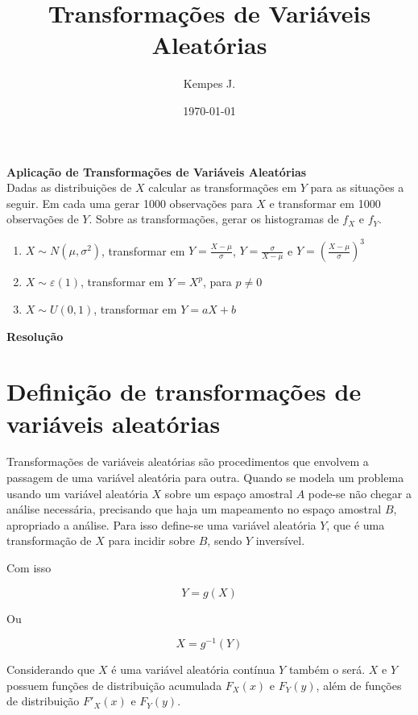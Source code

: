 \documentclass{article}
\title{Transformações de Variáveis Aleatórias}
\author{Kempes J.}
\date{\today}
\begin{document}


\maketitle
  
\LARGE{\textbf{Aplicação de Transformações de Variáveis Aleatórias}}\\
  
Dadas as distribuições de $X$ calcular as transformações em $Y$ para as situações a seguir. Em cada uma gerar 1000 observações para $X$ e transformar em 1000 observações de $Y$. Sobre as transformações, gerar os histogramas de $f_X$ e $f_Y$.\\

\begin{enumerate} 
  \item $X \sim N(\mu,\sigma^2)$, transformar em $Y = \frac{X-\mu}{\sigma}$, $Y = \frac{\sigma}{X-\mu}$ e $Y = (\frac{X-\mu}{\sigma})^3$
  \item $X \sim \varepsilon(1)$, transformar em $Y = X^p$, para $p \neq 0$ 
  \item $X \sim U(0,1)$, transformar em $Y = aX+b$
\end{enumerate}

\Large{\textbf{Resolução}}

\section{Definição de transformações de variáveis aleatórias}
  
Transformações de variáveis aleatórias são procedimentos que envolvem a passagem de uma variável aleatória para outra. Quando se modela um problema usando um variável aleatória $X$ sobre um espaço amostral $A$ pode-se não chegar a análise necessária, precisando que haja um mapeamento no espaço amostral $B$, apropriado a análise. Para isso define-se uma variável aleatória $Y$, que é uma transformação de $X$ para incidir sobre $B$, sendo $Y$ inversível.  

Com isso

\begin{equation}
Y = g(X)
\label{gx}
\end{equation}

Ou

\begin{equation}
X = g^{-1}(Y) 
\label{gy}
\end{equation}

Considerando que $X$ é uma variável aleatória contínua $Y$ também o será. $X$ e $Y$ possuem funções de distribuição acumulada $F_X(x)$ e $F_Y(y)$, além de funções de distribuição $F'_X(x)$ e $F_Y(y)$. 
\end{document}

